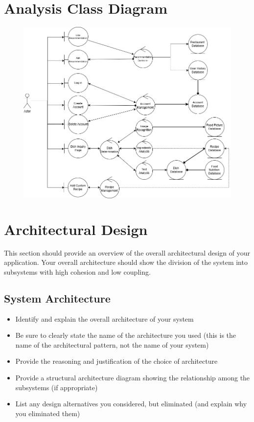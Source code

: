 \documentclass[]{article}
\begin{document}
\section{Analysis Class Diagram}
\label{sec:analysis_class_diagram}
\begin{figure}[H]
	\centering
   \includegraphics[width=\textwidth]{image/D2_2_analysis_class_diagram.png}
\end{figure}


\section{Architectural Design}
\label{sec:architectural_design}
This section should provide an overview of the overall architectural design of your application. Your overall architecture should show the division of the system into subsystems with high cohesion and low coupling.

\subsection{System Architecture}
\label{sub:system_architecture}
\begin{itemize}
	\item Identify and explain the overall architecture of your system
	\item Be sure to clearly state the name of the architecture you used (this is the name of the architectural pattern, not the name of your system)
	\item Provide the reasoning and justification of the choice of architecture
	\item Provide a structural architecture diagram showing the relationship among the subsystems (if appropriate)
	\item List any design alternatives you considered, but eliminated (and explain why you eliminated them)
\end{itemize}
\end{document}
